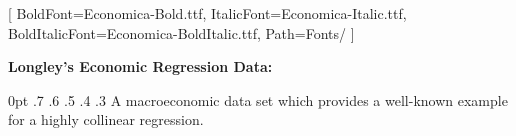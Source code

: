 \setmainfont{Economica-Regular.ttf}[
  BoldFont=Economica-Bold.ttf,
  ItalicFont=Economica-Italic.ttf,
  BoldItalicFont=Economica-BoldItalic.ttf,
  Path=Fonts/ 
]
\fontsize{14}{16}\selectfont
\begin{minipage}{3in}
{\bf Longley's Economic Regression Data:}

0pt .7\textwidth
0pt .6\textwidth
0pt .5\textwidth
0pt .4\textwidth
0pt .3\textwidth
A macroeconomic data set which provides a well-known example for a
highly collinear regression.

\end{minipage}
